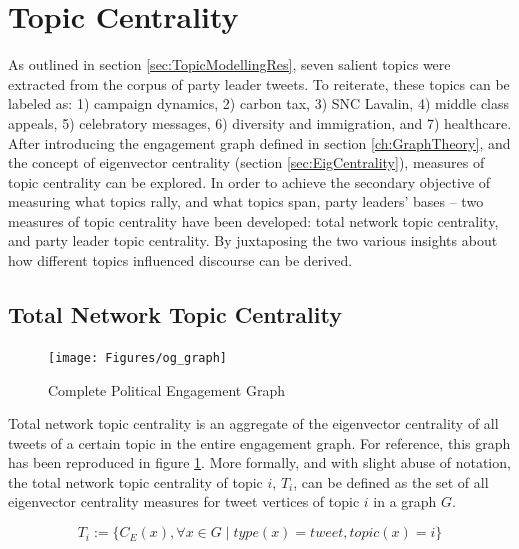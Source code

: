 \section{Topic Centrality}\label{sec:TopicCentrality}

As outlined in section \ref{sec:TopicModellingRes}, seven salient topics were
extracted from the corpus of party leader tweets. To reiterate, these topics can
be labeled as: 1) campaign dynamics, 2) carbon tax, 3) SNC Lavalin, 4) middle
class appeals, 5) celebratory messages, 6) diversity and immigration, and 7)
healthcare. After introducing the engagement graph defined in section \ref{ch:GraphTheory},
and the concept of eigenvector centrality (section \ref{sec:EigCentrality}),
measures of topic centrality can be explored. In order to achieve the secondary
objective of measuring what topics rally, and what topics span, party leaders'
bases -- two measures of topic centrality have been developed: total network
topic centrality, and party leader topic centrality. By juxtaposing the two
various insights about how different topics influenced discourse can be derived.

\subsection{Total Network Topic Centrality}\label{sec:NetTopicCentrality}

\begin{singlespacing}
    \begin{figure}[H]
    \centering
    \texttt{[image: Figures/og\_graph]}
    \caption[Complete Political Engagement Graph]{Complete Political Engagement Graph}
    \label{fig:og_graph_copy}
    \end{figure}
\end{singlespacing}

Total network topic centrality is an aggregate of the eigenvector centrality of
all tweets of a certain topic in the entire engagement graph. For reference,
this graph has been reproduced in figure \ref{fig:og_graph_copy}. More formally,
and with slight abuse of notation, the total network topic centrality of topic
$i$, $T_{i}$, can be defined as the set of all eigenvector centrality measures for tweet
vertices of topic $i$ in a graph $G$. 

\begin{equation}
    T_{i} := \{ C_{E}(x) , \forall x \in G \mid type(x)=tweet, topic(x)=i \}
\end{equation}

